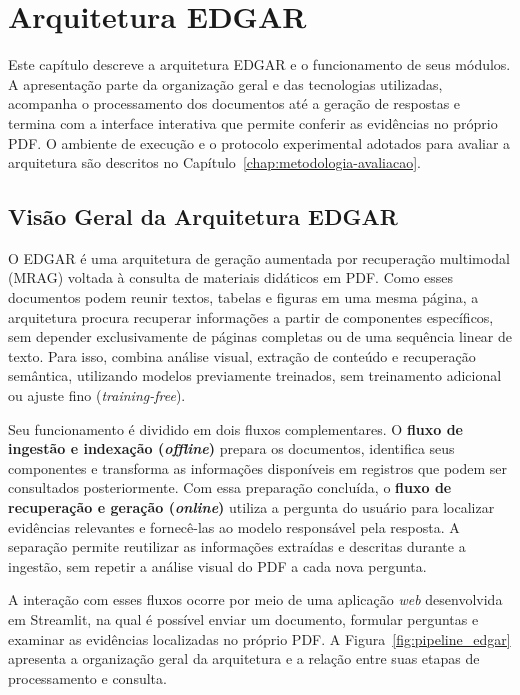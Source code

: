 \chapter{Arquitetura EDGAR}
\label{chap:arquitetura}

Este capítulo descreve a arquitetura EDGAR e o funcionamento de seus módulos. A apresentação parte da organização geral e das tecnologias utilizadas, acompanha o processamento dos documentos até a geração de respostas e termina com a interface interativa que permite conferir as evidências no próprio PDF. O ambiente de execução e o protocolo experimental adotados para avaliar a arquitetura são descritos no Capítulo~\ref{chap:metodologia-avaliacao}.

\section{Visão Geral da Arquitetura EDGAR}
\label{sec:visao_geral_arquitetura_edgar}

O EDGAR é uma arquitetura de geração aumentada por recuperação multimodal (MRAG) voltada à consulta de materiais didáticos em PDF. Como esses documentos podem reunir textos, tabelas e figuras em uma mesma página, a arquitetura procura recuperar informações a partir de componentes específicos, sem depender exclusivamente de páginas completas ou de uma sequência linear de texto. Para isso, combina análise visual, extração de conteúdo e recuperação semântica, utilizando modelos previamente treinados, sem treinamento adicional ou ajuste fino (\textit{training-free}).

Seu funcionamento é dividido em dois fluxos complementares. O \textbf{fluxo de ingestão e indexação (\textit{offline})} prepara os documentos, identifica seus componentes e transforma as informações disponíveis em registros que podem ser consultados posteriormente. Com essa preparação concluída, o \textbf{fluxo de recuperação e geração (\textit{online})} utiliza a pergunta do usuário para localizar evidências relevantes e fornecê-las ao modelo responsável pela resposta. A separação permite reutilizar as informações extraídas e descritas durante a ingestão, sem repetir a análise visual do PDF a cada nova pergunta.

A interação com esses fluxos ocorre por meio de uma aplicação \textit{web} desenvolvida em Streamlit, na qual é possível enviar um documento, formular perguntas e examinar as evidências localizadas no próprio PDF. A Figura~\ref{fig:pipeline_edgar} apresenta a organização geral da arquitetura e a relação entre suas etapas de processamento e consulta.


